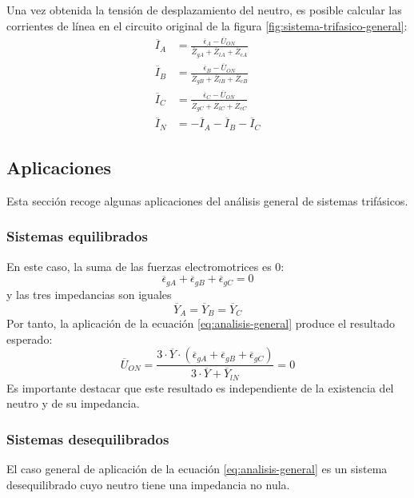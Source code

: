 Una vez obtenida la tensión de desplazamiento del neutro, es posible calcular las corrientes de línea en el circuito original de la figura \ref{fig:sistema-trifasico-general}:
\begin{align*}
  \overline{I}_A &= \frac{\overline{\epsilon}_A - \overline{U}_{ON}}{\overline{Z}_{gA} + \overline{Z}_{lA} + \overline{Z}_{cA}}\\
  \overline{I}_B &= \frac{\overline{\epsilon}_B - \overline{U}_{ON}}{\overline{Z}_{gB} + \overline{Z}_{lB} + \overline{Z}_{cB}}\\
  \overline{I}_C &= \frac{\overline{\epsilon}_C - \overline{U}_{ON}}{\overline{Z}_{gC} + \overline{Z}_{lC} + \overline{Z}_{cC}}\\
  \overline{I}_N &= -\overline{I}_A -\overline{I}_B -\overline{I}_C
\end{align*}

\subsection{Aplicaciones}
\label{sec:aplicaciones-analisis-general}

Esta sección recoge algunas aplicaciones del análisis general de sistemas trifásicos.

\subsubsection{Sistemas equilibrados}

En este caso, la suma de las fuerzas electromotrices es 0:
\[
  \overline{\epsilon}_{gA} + \overline{\epsilon}_{gB} + \overline{\epsilon}_{gC} = 0
\]
y las tres impedancias son iguales
\[
  \overline{Y}_A = \overline{Y}_B = \overline{Y}_C
\]
Por tanto, la aplicación de la ecuación \ref{eq:analisis-general} produce el resultado esperado:
\[
  \overline{U}_{ON} = \frac{3 \cdot \overline{Y} \cdot \left(  \overline{\epsilon}_{gA} + \overline{\epsilon}_{gB} + \overline{\epsilon}_{gC}\right)}{3 \cdot \overline{Y} + \overline{Y}_{lN}} = 0
\]
Es importante destacar que este resultado es independiente de la existencia del neutro y de su impedancia.

\subsubsection{Sistemas desequilibrados}

El caso general de aplicación de la ecuación \ref{eq:analisis-general} es un sistema desequilibrado cuyo neutro tiene una impedancia no nula.

